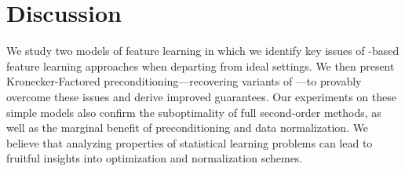 \vspace{-0.35cm}
\section{Discussion}
\vspace{-0.2cm}
We study two models of feature learning in which we identify key issues of \SGD-based feature learning approaches when departing from ideal settings. We then present Kronecker-Factored preconditioning---recovering variants of \KFAC---to provably overcome these issues and derive improved guarantees. Our experiments on these simple models also confirm the suboptimality of full second-order methods, as well as the marginal benefit of \Adam preconditioning and data normalization. We believe that analyzing properties of statistical learning problems can lead to fruitful insights into optimization and normalization schemes.%



